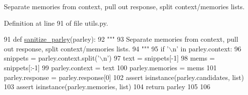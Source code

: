 \begin{DoxyVerb}Separate memories from context, pull out response, split context/memories lists.
\end{DoxyVerb}
 

Definition at line 91 of file utils.\+py.


\begin{DoxyCode}
91 \textcolor{keyword}{def }\hyperlink{namespaceprojects_1_1self__feeding_1_1utils_a82b7afe0cb01d90b1de3724f3a6b23fb}{sanitize\_parley}(parley):
92     \textcolor{stringliteral}{"""}
93 \textcolor{stringliteral}{    Separate memories from context, pull out response, split context/memories lists.}
94 \textcolor{stringliteral}{    """}
95     \textcolor{keywordflow}{if} \textcolor{stringliteral}{'\(\backslash\)n'} \textcolor{keywordflow}{in} parley.context:
96         snippets = parley.context.split(\textcolor{stringliteral}{'\(\backslash\)n'})
97         text = snippets[-1]
98         mems = snippets[:-1]
99         parley.context = text
100         parley.memories = mems
101     parley.response = parley.response[0]
102     \textcolor{keyword}{assert} isinstance(parley.candidates, list)
103     \textcolor{keyword}{assert} isinstance(parley.memories, list)
104     \textcolor{keywordflow}{return} parley
105 
106 
\end{DoxyCode}
